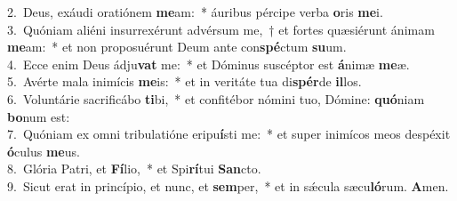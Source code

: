 {2.~}Deus, exáudi oratiónem \textbf{me}am:~* áuribus pércipe verba \textbf{o}ris \textbf{me}i.\\
{3.~}Quóniam aliéni insurrexérunt advérsum me,~† et fortes quæsiérunt ánimam \textbf{me}am:~* et non proposuérunt Deum ante con\textbf{spé}ctum \textbf{su}um.\\
{4.~}Ecce enim Deus ádju\textbf{vat} me:~* et Dóminus suscéptor est \textbf{á}nimæ \textbf{me}æ.\\
{5.~}Avérte mala inimícis \textbf{me}is:~* et in veritáte tua di\textbf{spér}de \textbf{il}los.\\
{6.~}Voluntárie sacrificábo \textbf{ti}bi,~* et confitébor nómini tuo, Dómine: \textbf{quó}niam \textbf{bo}num est:\\
{7.~}Quóniam ex omni tribulatióne eripu\textbf{í}sti me:~* et super inimícos meos despéxit \textbf{ó}culus \textbf{me}us.\\
{8.~}Glória Patri, et \textbf{Fí}lio,~* et Spi\textbf{rí}tui \textbf{San}cto.\\
{9.~}Sicut erat in princípio, et nunc, et \textbf{sem}per,~* et in sǽcula sæcu\textbf{ló}rum. \textbf{A}men.\\
